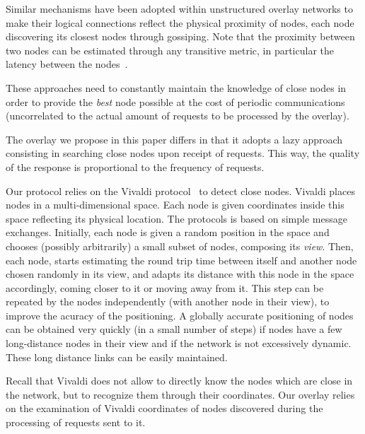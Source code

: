 Similar mechanisms have been adopted within unstructured overlay networks to
make their logical connections reflect the physical proximity of nodes, each
node discovering its closest nodes through gossiping. Note that the proximity
between two nodes can be estimated through any transitive metric, in particular
the latency between the nodes~\cite{refquivabienmarindoittrouver}.

These approaches need to constantly maintain the knowledge of close nodes in
order to provide the \emph{best} node possible at the cost of periodic
communications (uncorrelated to the actual amount of requests to be processed by
the overlay).

The overlay we propose in this paper differs in that it adopts a lazy approach
consisting in searching close nodes upon receipt of requests. This way, the
quality of the response is proportional to the frequency of requests. 
%

Our protocol relies on the Vivaldi protocol~\cite{dabek:2001:sigcomm04} to
detect close nodes. Vivaldi places nodes in a multi-dimensional space. Each node
is given coordinates inside this space reflecting its physical location. The
protocols is based on simple message exchanges. Initially, each node is given a
random position in the space and chooses (possibly arbitrarily) a small subset
of nodes, composing its \emph{view}. Then, each node, starts estimating the
round trip time between itself and another node chosen randomly in its view, and
adapts its distance with this node in the space accordingly, coming closer to it
or moving away from it. This step can be repeated by the nodes independently
(with another node in their view), to improve the acuracy of the positioning. A
globally accurate positioning of nodes can be obtained very quickly (in a small
number of steps) if nodes have a few long-distance nodes in their view and if
the network is not excessively dynamic. These long distance links can be easily
maintained. 

Recall that Vivaldi does not allow to directly know the nodes which are close in
the network, but to recognize them through their coordinates. Our overlay relies
on the examination of Vivaldi coordinates of nodes discovered during the
processing of requests sent to it.






